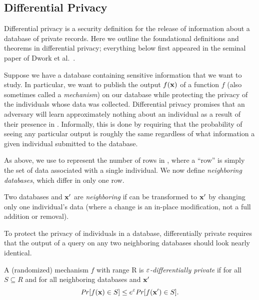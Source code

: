 
\subsection{Differential Privacy}
Differential privacy is a security definition for the release of information about a database of private records. Here we outline the foundational definitions and theorems in differential privacy; everything below first appeared in the seminal paper of Dwork et al.~\cite{dwork2006calibrating}.

Suppose we have a database \x containing sensitive information that we want to study. In particular, we want to publish the output $f(\mathbf{x})$ of a function $f$ (also sometimes called a \textit{mechanism}) on our database while protecting the privacy of the individuals whose data was collected. Differential privacy promises that an adversary will learn approximately nothing about an individual as a result of their presence in \x.  Informally, this is done by requiring that the probability of seeing any particular output is roughly the same regardless of what information a given individual submitted to the database.

As above, we use \dbsize to represent the number of rows in \x, where a ``row'' is simply the set of data associated with a single individual.  We now define \textit{neighboring databases}, which differ in only one row.

\begin{definition}\label{def:Neighboring} Two databases \x and $\mathbf{x}'$ are \textit{neighboring} if \x can be transformed to $\mathbf{x}'$ by changing only one individual's data (where a change is an in-place modification, not a full addition or removal).
\end{definition}

To protect the privacy of individuals in a database, differentially private requires that the output of a query on any two neighboring databases should look nearly identical.

\begin{definition} \label{def:diffpriv}
A (randomized) mechanism $f$ with range R is \emph{$\varepsilon$-differentially private} if for all $S \subseteq R$ and for all neighboring databases \x and $\mathbf{x}'$
\begin{equation*}
\text{\emph{Pr}}[f(\mathbf{x}) \in S] \leq e^{\varepsilon} \text{\emph{Pr}}[f(\mathbf{x}') \in S]. 
\end{equation*}
\end{definition}


